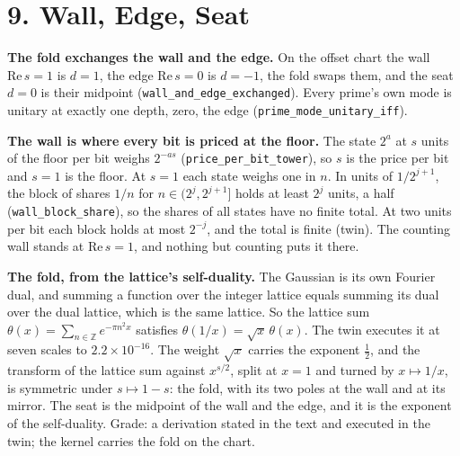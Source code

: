 \documentclass[10pt,twocolumn]{article}
\begin{document}
\hypertarget{wall-edge-seat}{%
\section{9. Wall, Edge, Seat}\label{wall-edge-seat}}

\textbf{The fold exchanges the wall and the edge.} On the offset chart
the wall \(\mathrm{Re}\,s=1\) is \(d=1\), the edge \(\mathrm{Re}\,s=0\)
is \(d=-1\), the fold swaps them, and the seat \(d=0\) is their midpoint
(\texttt{wall\_\allowbreak{}and\_\allowbreak{}edge\_\allowbreak{}exchanged}). Every prime's own mode is unitary
at exactly one depth, zero, the edge
(\texttt{prime\_\allowbreak{}mode\_\allowbreak{}unitary\_\allowbreak{}iff}).

\textbf{The wall is where every bit is priced at the floor.} The state
\(2^a\) at \(s\) units of the floor per bit weighs \(2^{-as}\)
(\texttt{price\_\allowbreak{}per\_\allowbreak{}bit\_\allowbreak{}tower}), so \(s\) is the price per bit and
\(s=1\) is the floor. At \(s=1\) each state weighs one in \(n\). In
units of \(1/2^{j+1}\), the block of shares \(1/n\) for
\(n\in(2^j,2^{j+1}]\) holds at least \(2^j\) units, a half
(\texttt{wall\_\allowbreak{}block\_\allowbreak{}share}), so the shares of all states have no
finite total. At two units per bit each block holds at most \(2^{-j}\),
and the total is finite (twin). The counting wall stands at
\(\mathrm{Re}\,s=1\), and nothing but counting puts it there.

\textbf{The fold, from the lattice's self-duality.} The Gaussian is its
own Fourier dual, and summing a function over the integer lattice equals
summing its dual over the dual lattice, which is the same lattice. So
the lattice sum \(\theta(x)=\sum_{n\in\mathbb Z}e^{-\pi n^2x}\)
satisfies \(\theta(1/x)=\sqrt x\,\theta(x)\). The twin executes it at
seven scales to \(2.2\times10^{-16}\). The weight \(\sqrt x\) carries
the exponent \(\tfrac12\), and the transform of the lattice sum against
\(x^{s/2}\), split at \(x=1\) and turned by \(x\mapsto1/x\), is
symmetric under \(s\mapsto1-s\): the fold, with its two poles at the
wall and at its mirror. The seat is the midpoint of the wall and the
edge, and it is the exponent of the self-duality. Grade: a derivation
stated in the text and executed in the twin; the kernel carries the fold
on the chart.
\end{document}

